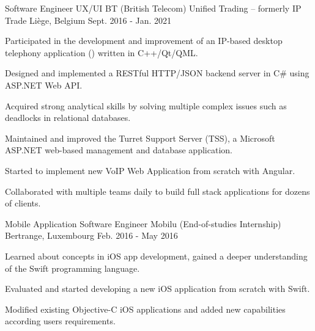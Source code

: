 \begin{cventries}
  \cventry
    {Software Engineer UX/UI} %
    {BT (British Telecom) Unified Trading -- formerly IP Trade} %
    {Liège, Belgium} %
    {Sept. 2016 - Jan. 2021} %
    {
      \begin{cvitems} %
        \item{Participated in the development and improvement of an IP-based desktop telephony application () written in C++/Qt/QML.}
        \item{Designed and implemented a RESTful HTTP/JSON backend server in C\# using ASP.NET Web API.}
        \item{Acquired strong analytical skills by solving multiple complex issues such as deadlocks in relational databases.}
        \item{Maintained and improved the Turret Support Server (TSS), a Microsoft ASP.NET web-based management and database application.}
        \item{Started to implement new VoIP Web Application from scratch with Angular.}
        \item{Collaborated with multiple teams daily to build full stack applications for dozens of clients.}
      \end{cvitems}
    }

  \cventry
    {Mobile Application Software Engineer} %
    {Mobilu (End-of-studies Internship)} %
    {Bertrange, Luxembourg} %
    {Feb. 2016 - May 2016} %
    {
      \begin{cvitems} %
        \item{Learned about concepts in iOS app development, gained a deeper understanding of the Swift programming language.}
        \item{Evaluated and started developing a new iOS application from scratch with Swift.}
        \item{Modified existing Objective-C iOS applications and added new capabilities according users requirements.}
      \end{cvitems}
    }


\end{cventries}
